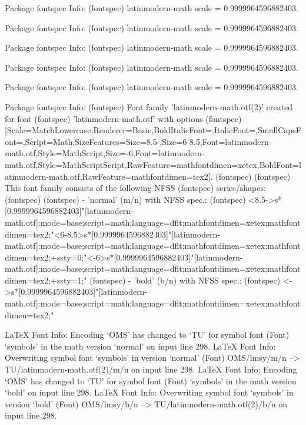 Package fontspec Info: 
(fontspec)             latinmodern-math scale = 0.9999964596882403.


Package fontspec Info: 
(fontspec)             latinmodern-math scale = 0.9999964596882403.


Package fontspec Info: 
(fontspec)             latinmodern-math scale = 0.9999964596882403.


Package fontspec Info: 
(fontspec)             latinmodern-math scale = 0.9999964596882403.


Package fontspec Info: 
(fontspec)             latinmodern-math scale = 0.9999964596882403.


Package fontspec Info: 
(fontspec)             Font family 'latinmodern-math.otf(2)' created for font
(fontspec)             'latinmodern-math.otf' with options
(fontspec)             [Scale=MatchLowercase,Renderer=Basic,BoldItalicFont={},ItalicFont={},SmallCapsFont={},Script=Math,SizeFeatures={{Size=8.5-},{Size=6-8.5,Font=latinmodern-math.otf,Style=MathScript},{Size=-6,Font=latinmodern-math.otf,Style=MathScriptScript}},RawFeature={mathfontdimen=xetex},BoldFont={latinmodern-math.otf},RawFeature={mathfontdimen=tex2}].
(fontspec)              
(fontspec)              This font family consists of the following NFSS
(fontspec)             series/shapes:
(fontspec)              
(fontspec)             - 'normal' (m/n) with NFSS spec.:
(fontspec)             <8.5->s*[0.9999964596882403]"[latinmodern-math.otf]:mode=base;script=math;language=dflt;mathfontdimen=xetex;mathfontdimen=tex2;"<6-8.5>s*[0.9999964596882403]"[latinmodern-math.otf]:mode=base;script=math;language=dflt;mathfontdimen=xetex;mathfontdimen=tex2;+ssty=0;"<-6>s*[0.9999964596882403]"[latinmodern-math.otf]:mode=base;script=math;language=dflt;mathfontdimen=xetex;mathfontdimen=tex2;+ssty=1;"
(fontspec)             - 'bold' (b/n) with NFSS spec.:
(fontspec)             <->s*[0.9999964596882403]"[latinmodern-math.otf]:mode=base;script=math;language=dflt;mathfontdimen=xetex;mathfontdimen=tex2;"

LaTeX Font Info:    Encoding `OMS' has changed to `TU' for symbol font
(Font)              `symbols' in the math version `normal' on input line 298.
LaTeX Font Info:    Overwriting symbol font `symbols' in version `normal'
(Font)                  OMS/lmsy/m/n --> TU/latinmodern-math.otf(2)/m/n on input line 298.
LaTeX Font Info:    Encoding `OMS' has changed to `TU' for symbol font
(Font)              `symbols' in the math version `bold' on input line 298.
LaTeX Font Info:    Overwriting symbol font `symbols' in version `bold'
(Font)                  OMS/lmsy/b/n --> TU/latinmodern-math.otf(2)/b/n on input line 298.

